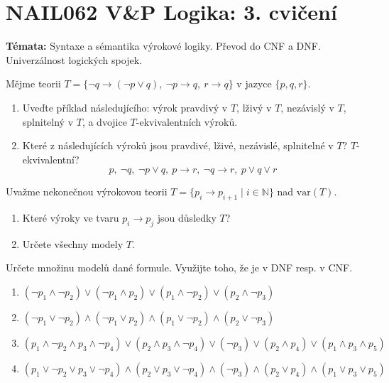 \documentclass[a4paper,12pt]{article}
\begin{document}
\section*{NAIL062 V\&P Logika: 3. cvičení}

\textbf{Témata:} 
Syntaxe a sémantika výrokové logiky. Převod do CNF a DNF. Univerzálnost logických spojek.


\medskip\begin{problem}
    Mějme teorii $T=\{\neg q \to (\neg p \vee q),\ \neg p \to q,\ r \to q\}$ v jazyce $\{p, q, r\}$.
    \begin{enumerate}
        \item Uveďte příklad následujícího: výrok pravdivý v $T$, lživý v $T$, nezávislý v $T$, splnitelný v $T$, a dvojice $T$-ekvivalentních výroků.
        \item Které z následujících výroků jsou pravdivé, lživé, nezávislé, splnitelné v $T$? $T$-ekvivalentní? 
        $$
        p, \ \neg q, \ \neg p\vee q, \ p\to r,\ \neg q\to r, \ p\vee q\vee r
        $$
    \end{enumerate}
\end{problem}


\medskip\begin{problem}
    Uvažme nekonečnou výrokovou teorii $T=\{p_i \to p_{i+1}\mid i\in \mathbb{N}\}$ nad $\mathrm{var}(T)$. 
    \begin{enumerate}
        \item Které výroky ve tvaru  $p_i \to p_j$ jsou důsledky $T$?
        \item Určete všechny modely $T$.
    \end{enumerate}
    \end{problem}
    
    
\medskip\begin{problem} Určete množinu modelů dané formule. Využijte toho, že je v DNF resp. v CNF.
\begin{enumerate}
    \item $(\neg p_1 \wedge \neg p_2)\vee( \neg p_1 \wedge p_2)\vee( p_1 \wedge \neg p_2)\vee( p_2 \wedge \neg p_3)$
    \item $(\neg p_1 \vee \neg p_2)\wedge( \neg p_1 \vee p_2)\wedge( p_1 \vee \neg p_2)\wedge( p_2 \vee \neg p_3)$
    \item $(p_1 \wedge  \neg p_2 \wedge  p_3 \wedge  \neg p_4 )\vee(p_2 \wedge  p_3 \wedge  \neg p_4 )\vee(\neg p_3)\vee(p_2 \wedge  p_4)\vee(p_1 \wedge  p_3 \wedge  p_5 )$
    \item $(p_1 \vee \neg p_2 \vee p_3 \vee \neg p_4 )\wedge(p_2 \vee p_3 \vee \neg p_4 )\wedge(\neg p_3)\wedge(p_2 \vee p_4)\wedge(p_1 \vee p_3 \vee p_5 )$
\end{enumerate}
\end{problem}
    
\end{document}
